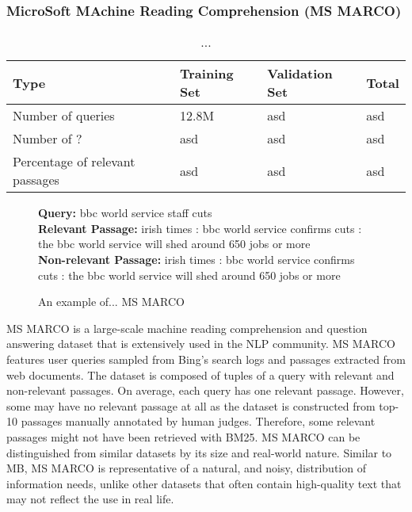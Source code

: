 \subsubsection{MicroSoft MAchine Reading Comprehension (MS MARCO)}

\begin{table}[b]
\vspace{0.2cm}
\centering
\begin{tabular}{llll}
\toprule
\textbf{Type} \mbox{\hspace{0.5cm}} & \textbf{Training Set} \mbox{\hspace{1.0cm}} & \textbf{Validation Set} \mbox{\hspace{1.0cm}} & \textbf{Total} \mbox{\hspace{1.0cm}} \\
\toprule
Number of queries & 12.8M & asd & asd \\
Number  of ? & asd & asd & asd \\
Percentage of relevant passages  & asd      & asd & asd   \\
\bottomrule
\end{tabular}
\vspace{0.2cm}
\caption{...}%
\label{tab:marco-stats}
\vspace{-0.6cm}
\end{table}

\begin{figure}[b!]
	\begin{framed}
		\centering
    		\textbf{Query:} bbc world service staff cuts \\
    		\textbf{Relevant Passage:} irish times : bbc world service confirms cuts : the bbc world service will shed around 650 jobs or more \\
    		\textbf{Non-relevant Passage:} irish times : bbc world service confirms cuts : the bbc world service will shed around 650 jobs or more \\
	\end{framed}
\label{marco-example}
 \caption{ An example of... MS MARCO}
\end{figure}

MS MARCO is a large-scale machine reading comprehension and question answering dataset that is extensively used in the NLP community.
MS MARCO \cite{nguyen2016msmarco} features user queries sampled from Bing’s search logs and passages extracted from web documents.
The dataset is composed of tuples of a query with relevant and non-relevant passages.
On average, each query has one relevant passage.
However, some may have no relevant passage at all as the dataset is constructed from  top-10 passages manually annotated by human judges.
Therefore, some relevant passages might not have been retrieved with BM25.
MS MARCO can be distinguished from similar datasets by its size and real-world nature.
Similar to MB, MS MARCO is representative of a natural, and noisy, distribution of information needs, unlike other datasets that often contain high-quality text that may not reflect the use in real life.

